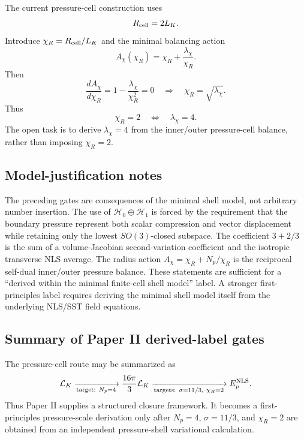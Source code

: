 \documentclass[11pt]{article}
\begin{document}
The current pressure-cell construction uses
\[
  R_{\rm cell}=2L_K.
\]
Introduce \(\chi_R=R_{\rm cell}/L_K\) and the minimal balancing action
\begin{equation}
  A_\chi(\chi_R)
  =
  \chi_R+\frac{\lambda_\chi}{\chi_R}.
  \label{eq:app-Achi-minimal}
\end{equation}
Then
\begin{equation}
  \frac{dA_\chi}{d\chi_R}
  =
  1-\frac{\lambda_\chi}{\chi_R^2}=0
  \quad\Longrightarrow\quad
  \chi_R=\sqrt{\lambda_\chi}.
\end{equation}
Thus
\begin{equation}
  \chi_R=2
  \quad\Longleftrightarrow\quad
  \lambda_\chi=4.
  \label{eq:app-chi-target}
\end{equation}
The open task is to derive \(\lambda_\chi=4\) from the inner/outer
pressure-cell balance, rather than imposing \(\chi_R=2\).


\subsection{Model-justification notes}

The preceding gates are consequences of the minimal shell model, not arbitrary
number insertion.  The use of \(\mathcal H_0\oplus\mathcal H_1\) is forced by
the requirement that the boundary pressure represent both scalar compression
and vector displacement while retaining only the lowest \(SO(3)\)-closed
subspace.  The coefficient \(3+2/3\) is the sum of a volume-Jacobian
second-variation coefficient and the isotropic transverse NLS average.  The
radius action \(A_\chi=\chi_R+N_p/\chi_R\) is the reciprocal self-dual
inner/outer pressure balance.  These statements are sufficient for a
``derived within the minimal finite-cell shell model'' label.  A stronger
first-principles label requires deriving the minimal shell model itself from
the underlying NLS/SST field equations.

\subsection{Summary of Paper II derived-label gates}

The pressure-cell route may be summarized as
\[
  \mathcal L_K
  \xrightarrow[\text{target: }N_p=4]{}
  \frac{16\pi}{3}\mathcal L_K
  \xrightarrow[\text{targets: }\sigma=11/3,\ \chi_R=2]{}
  E_p^{\rm NLS}.
\]
Thus Paper II supplies a structured closure framework.  It becomes a
first-principles pressure-scale derivation only after \(N_p=4\),
\(\sigma=11/3\), and \(\chi_R=2\) are obtained from an independent
pressure-shell variational calculation.
\end{document}
